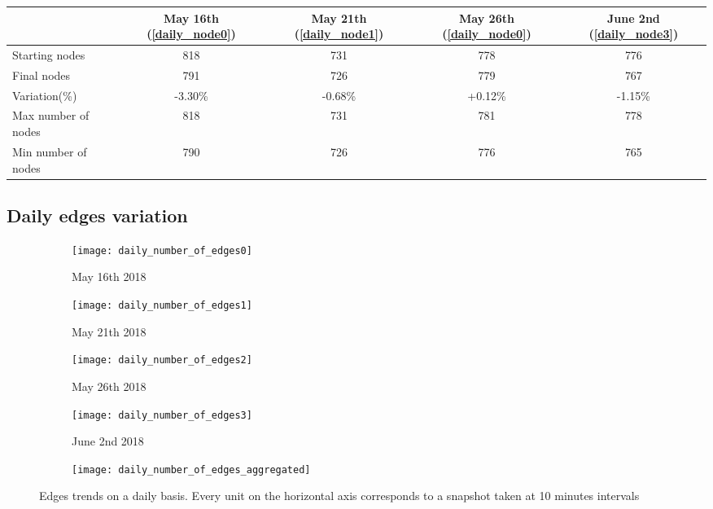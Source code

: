	\begin{center}
		\begin{tabulary}{\linewidth}{| L | C | C | C | C |}
			\hline
			 & May 16th (\ref{daily_node0}) & May 21th (\ref{daily_node1}) & May 26th (\ref{daily_node0}) & June 2nd (\ref{daily_node3}) \\
			\hline
			Starting nodes & 818 & 731 & 778 & 776 \\ \hline
			Final nodes & 791 & 726 & 779 & 767 \\ \hline
			Variation(\%) & -3.30\% & -0.68\% & +0.12\% & -1.15\% \\ \hline
			Max number of nodes & 818 & 731 & 781 & 778 \\ \hline
			Min number of nodes & 790 & 726 & 776 & 765 \\ \hline

		\end{tabulary}
	\end{center}
	
	\subsection{Daily edges variation}

	\begin{figure}[htbp!]
		\centering
		\begin{subfigure}{0.49\textwidth}
			\centering
			\texttt{[image: daily\_number\_of\_edges0]}
			\caption{May 16th 2018}
			\label{daily_edges0}
		\end{subfigure}
		\begin{subfigure}{0.49\textwidth}
			\centering
			\texttt{[image: daily\_number\_of\_edges1]}
			\caption{May 21th 2018}
			\label{daily_edges1}
		\end{subfigure}
		\begin{subfigure}{0.49\textwidth}
			\centering
			\texttt{[image: daily\_number\_of\_edges2]}
			\caption{May 26th 2018}
			\label{daily_edges2}
		\end{subfigure}
		\begin{subfigure}{0.49\textwidth}
			\centering
			\texttt{[image: daily\_number\_of\_edges3]}
			\caption{June 2nd 2018}
			\label{daily_edges3}
		\end{subfigure}
		\begin{subfigure}{\textwidth}
			\centering
			\texttt{[image: daily\_number\_of\_edges\_aggregated]}
			\caption{}
		\end{subfigure}		
		\caption{Edges trends on a daily basis. Every unit on the horizontal axis corresponds to a snapshot taken at 10 minutes intervals}
		\label{daily_edges_variation}
	\end{figure}

